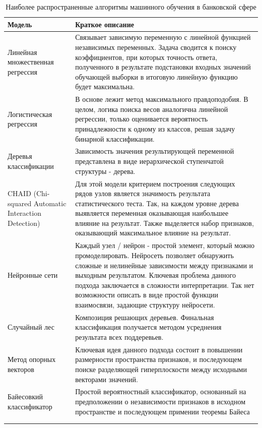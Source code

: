 \documentclass[12pt,a4paper]{article} %
\begin{document}
\begin{center}
	\begin{longtable}{p{5cm}|p{10cm}}
		\hline Модель & Краткое описание    \\
		\endhead
		\hline Линейная множественная регрессия & Связывает зависимую переменную с линейной функцией независимых переменных. Задача сводится к поиску коэффициентов, при которых точность ответа, полученного в результате подстановки входных значений обучающей выборки в итоговую линейную функцию будет максимальна.  
		 \\
		 \hline
		Логистическая регрессия & В основе лежит метод максимального правдоподобия. В целом, логика поиска весов аналогична  линейной регрессии, только оценивается вероятность принадлежности к одному из классов, решая задачу бинарной классификации.
		  \\
		  \hline
		Деревья классификации 
		 & Зависимость значения результирующей переменной представлена в виде иерархической ступенчатой структуры - дерева. 
		  \\
		  \hline
		 CHAID (Chi-squared Automatic Interaction Detection)& Для этой модели критерием построения следующих рядов узлов является значимость результата статистического теста. Так, на каждом уровне дерева выявляется переменная оказывающая наибольшее влияние на результат. Также выделяется набор признаков, оказывающий максимальное влияние на результат.
		    \\
		\hline
		Нейронные сети&   
		 Каждый узел / нейрон - простой элемент, который можно промоделировать. Нейросеть позволяет обнаружить сложные и нелинейные зависимости между признаками и выходным результатом. Ключевая проблема данного подхода заключается в сложности интерпретации. Так нет возможности   описать в виде простой функции взаимосвязи, задающие структуру нейросети. \\
		 \hline
		Случайный лес&
		Композиция решающих деревьев. Финальная классификация получается методом усреднения результата всех поддеревьев.
		\\
		\hline
		Метод опорных векторов&
		Ключевая идея данного подхода состоит в повышении размерности пространства признаков, и последующем поиске разделяющей гиперплоскости между исходными векторами значений.
		\\
		\hline
		
		Байесовкий классификатор&Простой вероятностный классификатор, основанный на предположении о независимости признаков в исходном пространстве и последующем примении теоремы Байеса\\
		\\
		\hline 
		\caption{Наиболее распространенные алгоритмы машинного обучения в банковской сфере}
		\label{Tab:1}\\
	\end{longtable}

\end{center}
\end{document}
